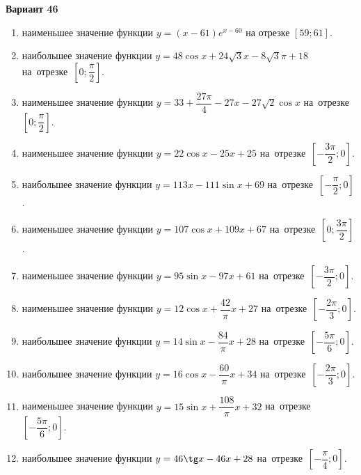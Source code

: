 \documentclass[a4paper,10pt]{article}
\begin{document}
\begin{center}\Large\textbf{Вариант 46}\end{center}

\begin{enumerate}
\item {} наименьшее значение функции $y = \left(x-61\right)e^{x-60}$ на отрезке $\left[59;61\right]$.

\item {} наибольшее значение функции $y = 48\cos x+24\sqrt{3}x-8\sqrt{3}\pi +18$ на~отрезке~$\left[0;\dfrac{\pi }{2}\right]$.

\item {} наименьшее значение функции $y = 33+\dfrac{27 \pi}{4}-27x-27\sqrt{2}\cos x$ на~отрезке~$\left[0;\dfrac{\pi }{2}\right]$.

\item {} наименьшее значение функции $y = 22\cos x-25x+25$ на~отрезке~$\left[-\dfrac{3\pi }{2};0\right]$.

\item {} наибольшее значение функции $y = 113x-111\sin x+69$ на~отрезке~$\left[-\dfrac{\pi }{2};0\right]$.

\item {} наименьшее значение функции $y = 107\cos x+109x+67$ на~отрезке~$\left[0;\dfrac{3\pi }{2}\right]$.

\item {} наименьшее значение функции $y = 95\sin x-97x+61$ на~отрезке~$\left[-\dfrac{3\pi }{2};0\right]$.

\item {} наименьшее значение функции $y = 12\cos x+\dfrac{42}{\pi }x +27$ на~отрезке~$\left[-\dfrac{2\pi }{3};0\right]$.

\item {} наибольшее значение функции $y = 14\sin x-\dfrac{84}{\pi }x+28$ на~отрезке~$\left[-\dfrac{5\pi }{6};0\right]$.

\item {} наибольшее значение функции $y = 16\cos x-\dfrac{60}{\pi }x+34$ на~отрезке~$\left[-\dfrac{2\pi }{3};0\right]$.

\item {} наименьшее значение функции $y = 15\sin x+\dfrac{108}{\pi }x+32$ на~отрезке~$\left[-\dfrac{5\pi }{6};0\right]$.

\item {} наибольшее значение функции $y = 46\tg x-46x+28$ на~отрезке~$\left[-\dfrac{\pi }{4};0\right]$.


\end{enumerate}
\end{document}

